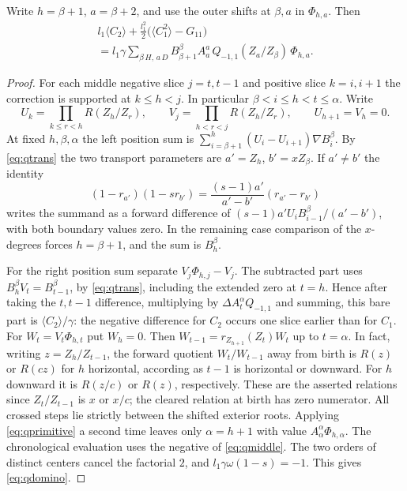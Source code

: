 \begin{lemma}\label{lem:quadraticdomino}
Write $h=\beta+1$, $a=\beta+2$, and use the outer shifts at $\beta,a$
in $\Phi_{h,a}$. Then
\begin{multline}\label{eq:qdomino}
 l_1\langle C_2\rangle+
 \frac{l_1^2}{2}\big(\langle C_1^2\rangle-G_{11}\big)\\
 =l_1\gamma\sum_{\beta\,H,\,a\,D}
 B_{\beta+1}^\beta A_a^a\,Q_{-1,1}(Z_a/Z_\beta)\,\Phi_{h,a}.
\end{multline}
\end{lemma}
\begin{proof}
For each middle negative slice $j=t,t-1$ and positive slice $k=i,i+1$
the correction is supported at $k\le h<j$. In particular $\beta<i\le
h<t\le\alpha$. Write
\[
 U_k=\prod_{k\le r<h}R(Z_h/Z_r),\qquad
 V_j=\prod_{h<r<j}R(Z_h/Z_r),\qquad U_{h+1}=V_h=0 .
\]
At fixed $h,\beta,\alpha$ the left position sum is
$\sum_{i=\beta+1}^{h}(U_i-U_{i+1})\nabla B_i^\beta$.
By \eqref{eq:qtrans} the two transport parameters are $a'=Z_h$,
$b'=xZ_\beta$. If $a'\ne b'$ the identity
\begin{equation}\label{eq:qprimitive}
 (1-r_{a'})(1-sr_{b'})
       =\frac{(s-1)a'}{a'-b'}(r_{a'}-r_{b'})
\end{equation}
writes the summand as a forward difference of
$(s-1)a'U_i B_{i-1}^\beta/(a'-b')$, with both boundary values zero.
In the remaining case comparison of the $x$-degrees forces $h=\beta+1$,
and the sum is $B_h^\beta$.

For the right position sum separate $V_j\Phi_{h,j}-V_j$.
The subtracted part uses $B_h^\beta V_t=B_{t-1}^\beta$,
by \eqref{eq:qtrans}, including the extended zero at $t=h$.
Hence after taking the $t,t-1$ difference, multiplying by
$\Delta A_t^\alpha Q_{-1,1}$ and summing, this bare part is
$\langle C_2\rangle/\gamma$: the negative difference for $C_2$
occurs one slice earlier than for $C_1$.
For $W_t=V_t\Phi_{h,t}$ put $W_h=0$. Then
$W_{t-1}=r_{Z_{h+1}}(Z_t)W_t$ up to $t=\alpha$.
In fact, writing $z=Z_h/Z_{t-1}$, the forward quotient $W_t/W_{t-1}$
away from birth is $R(z)$ or $R(cz)$ for $h$ horizontal,
according as $t-1$ is horizontal or downward. For $h$ downward it is
$R(z/c)$ or $R(z)$, respectively. These are the asserted relations
since $Z_t/Z_{t-1}$ is $x$ or $x/c$; the cleared relation at birth has
zero numerator. All crossed steps lie strictly between the shifted
exterior roots. Applying \eqref{eq:qprimitive} a second time leaves only
$\alpha=h+1$ with value $A_\alpha^\alpha\Phi_{h,\alpha}$.
The chronological evaluation uses the negative of \eqref{eq:qmiddle}.
The two orders of distinct centers cancel the factorial $2$, and
$l_1\gamma\omega(1-s)=-1$. This gives \eqref{eq:qdomino}.
\end{proof}

